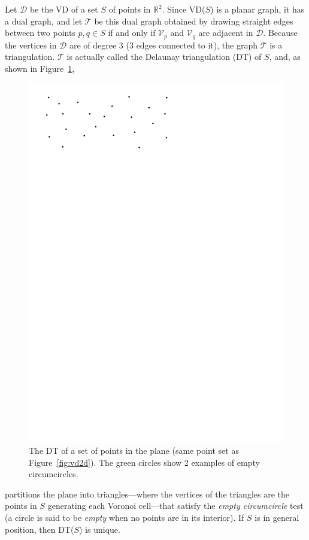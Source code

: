 Let $\mathcal{D}$ be the VD of a set $S$ of points in $\mathbb{R}^2$. 
Since VD($S$) is a planar graph, it has a dual graph, and let $\mathcal{T}$ be this dual graph obtained by drawing straight edges between two points $p,q \in S$ if and only if $\mathcal{V}_{p}$ and $\mathcal{V}_{q}$ are adjacent in $\mathcal{D}$. 
Because the vertices in $\mathcal{D}$ are of degree 3 (3 edges connected to it), the graph $\mathcal{T}$ is a triangulation. 
$\mathcal{T}$ is actually called the Delaunay triangulation (DT) of $S$, and, as shown in Figure~\ref{fig:dt2da}, 
\begin{figure}
  \centering
   \includegraphics[page=4,width=\textwidth]{vd2d}
  \caption{The DT of a set of points in the plane (same point set as Figure~\ref{fig:vd2d}). The green circles show 2 examples of empty circumcircles.}%
\label{fig:dt2da}
\end{figure}
partitions the plane into triangles---where the vertices of the triangles are the points in $S$ generating each Voronoi cell---that satisfy the \emph{empty circumcircle} test (a circle is said to be \emph{empty} when no points are in its interior). 
If $S$ is in general position, then DT($S$) is unique.

